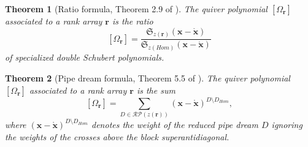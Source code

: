 \documentclass[reqno]{amsart}
\numberwithin{equation}{section}
\newtheorem{theorem}{Theorem}[section]
\theoremstyle{definition}
\theoremstyle{remark}
\begin{document}
\begin{theorem}[Ratio formula, Theorem 2.9 of \cite{kms06}]\label{thm:oldratio}
The quiver polynomial $[\Omega_{\mathbf{r}}]$ associated to a rank array $\mathbf{r}$ is the ratio
\[[\Omega_{\mathbf{r}}]=\frac{\mathfrak{S}_{z(\mathbf{r})}(\mathbf{x}-\mathring{\mathbf{x}})}{\mathfrak{S}_{z(Hom)}(\mathbf{x}-\mathring{\mathbf{x}})}\]
of specialized double Schubert polynomials.
\end{theorem}
\begin{theorem}[Pipe dream formula, Theorem 5.5 of \cite{kms06}]\label{thm:oldpd}
The quiver polynomial $[\Omega_{\mathbf{r}}]$ associated to a rank array $\mathbf{r}$ is the sum
\[[\Omega_{\mathbf{r}}]=\sum_{D \in \mathcal{RP}(z(\mathbf{r}))} (\mathbf{x}-\mathring{\mathbf{x}})^{D \setminus D_{Hom}},\]
where $(\mathbf{x}-\mathring{\mathbf{x}})^{D \setminus D_{Hom}}$ denotes the weight of the reduced pipe dream $D$ ignoring the weights of the crosses above the block superantidiagonal.
\end{theorem}
\end{document}
